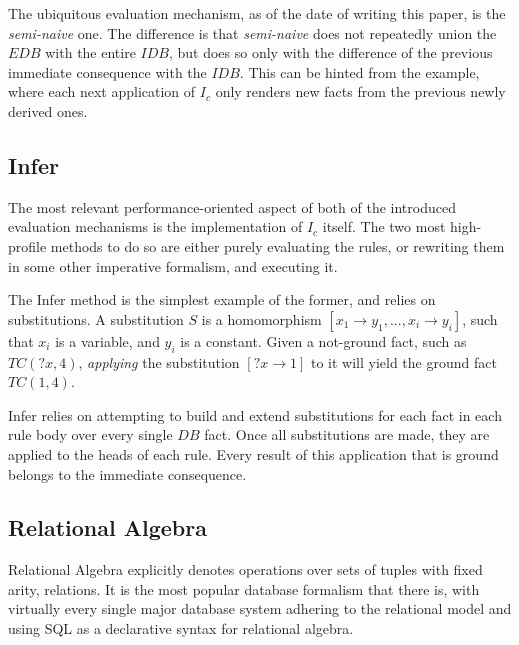 \documentclass[manuscript,screen,review]{acmart}
\theoremstyle{definition}
\begin{document}
The ubiquitous evaluation mechanism, as of the date of writing this paper, is the \textit{semi-naive} one. The difference is that \textit{semi-naive} does not repeatedly union the $EDB$ with the entire $IDB$, but does so only with the difference of the previous immediate consequence with the $IDB$. This can be hinted from the example, where each next application of $I_c$ only renders new facts from the previous newly derived ones.

\subsection{Infer}
The most relevant performance-oriented aspect of both of the introduced evaluation mechanisms is the implementation of $I_c$ itself. The two
most high-profile methods to do so are either purely evaluating the rules, or rewriting them in some other imperative formalism, and executing it.

The Infer\cite{datalog} method is the simplest example of the former, and relies on substitutions. A substitution $S$ is a homomorphism
$[x_1 \rightarrow y_1, ..., x_i \rightarrow y_i]$, such that $x_i$ is a variable, and $y_i$ is a constant. Given a not-ground fact,
such as $TC(?x, 4)$, \textit{applying} the substitution $[?x \rightarrow 1]$ to it will yield the ground fact $TC(1, 4)$.

Infer relies on attempting to build and extend substitutions for each fact in each rule body over every single $DB$ fact. Once
all substitutions are made, they are applied to the heads of each rule. Every result of this application that is ground belongs
to the immediate consequence.

\subsection{Relational Algebra}
Relational Algebra\cite{codd_1970} explicitly denotes operations over sets of tuples with fixed arity, relations. It is
the most popular database formalism that there is, with virtually every single major database system adhering to the relational model\cite{pg,mysql,sqlserver}
and using SQL as a declarative syntax for relational algebra.
\end{document}
